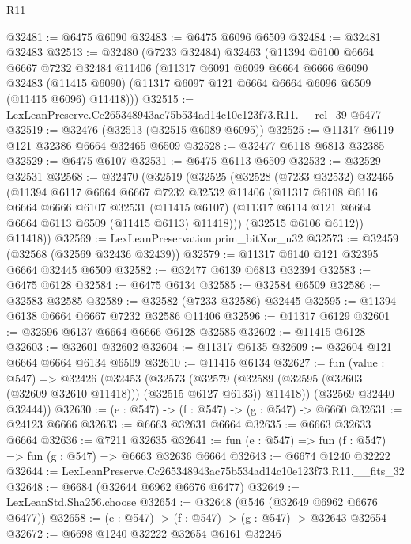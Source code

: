 \begin{lexlean}{R11}
\begin{coremodule}
@32481 := @6475 @6090
@32483 := @6475 @6096 @6509
@32484 := @32481 @32483
@32513 := @32480
    (@7233 @32484)
    @32463
    (@11394
      @6100
      @6664
      @6667
      @7232
      @32484
      @11406
      (@11317
        @6091
        @6099
        @6664
        @6666
        @6090
        @32483
        (@11415 @6090)
        (@11317 @6097 @121 @6664 @6664 @6096 @6509 (@11415 @6096) @11418)))
@32515 := LexLeanPreserve.Cc265348943ac75b534ad14c10e123f73.R11.__rel_39 @6477
@32519 := @32476 (@32513 (@32515 @6089 @6095))
@32525 := @11317 @6119 @121 @32386 @6664 @32465 @6509
@32528 := @32477 @6118 @6813 @32385
@32529 := @6475 @6107
@32531 := @6475 @6113 @6509
@32532 := @32529 @32531
@32568 := @32470
    (@32519
      (@32525
        (@32528
          (@7233 @32532)
          @32465
          (@11394
            @6117
            @6664
            @6667
            @7232
            @32532
            @11406
            (@11317
              @6108
              @6116
              @6664
              @6666
              @6107
              @32531
              (@11415 @6107)
              (@11317 @6114 @121 @6664 @6664 @6113 @6509 (@11415 @6113) @11418)))
          (@32515 @6106 @6112))
        @11418))
@32569 := LexLeanPreservation.prim_bitXor_u32
@32573 := @32459 (@32568 (@32569 @32436 @32439))
@32579 := @11317 @6140 @121 @32395 @6664 @32445 @6509
@32582 := @32477 @6139 @6813 @32394
@32583 := @6475 @6128
@32584 := @6475 @6134
@32585 := @32584 @6509
@32586 := @32583 @32585
@32589 := @32582 (@7233 @32586) @32445
@32595 := @11394 @6138 @6664 @6667 @7232 @32586 @11406
@32596 := @11317 @6129
@32601 := @32596 @6137 @6664 @6666 @6128 @32585
@32602 := @11415 @6128
@32603 := @32601 @32602
@32604 := @11317 @6135
@32609 := @32604 @121 @6664 @6664 @6134 @6509
@32610 := @11415 @6134
@32627 := fun (value : @547) =>
  @32426
    (@32453
      (@32573
        (@32579 (@32589 (@32595 (@32603 (@32609 @32610 @11418))) (@32515 @6127 @6133)) @11418))
      (@32569 @32440 @32444))
@32630 := (e : @547) -> (f : @547) -> (g : @547) -> @6660
@32631 := @24123 @6666
@32633 := @6663 @32631 @6664
@32635 := @6663 @32633 @6664
@32636 := @7211 @32635
@32641 := fun (e : @547) => fun (f : @547) => fun (g : @547) => @6663 @32636 @6664
@32643 := @6674 @1240 @32222
@32644 := LexLeanPreserve.Cc265348943ac75b534ad14c10e123f73.R11.__fits_32
@32648 := @6684 (@32644 @6962 @6676 @6477)
@32649 := LexLeanStd.Sha256.choose
@32654 := @32648 (@546 (@32649 @6962 @6676 @6477))
@32658 := (e : @547) -> (f : @547) -> (g : @547) -> @32643 @32654
@32672 := @6698
    @1240
    @32222
    @32654
    @6161
    @32246

\end{coremodule}
\end{lexlean}
